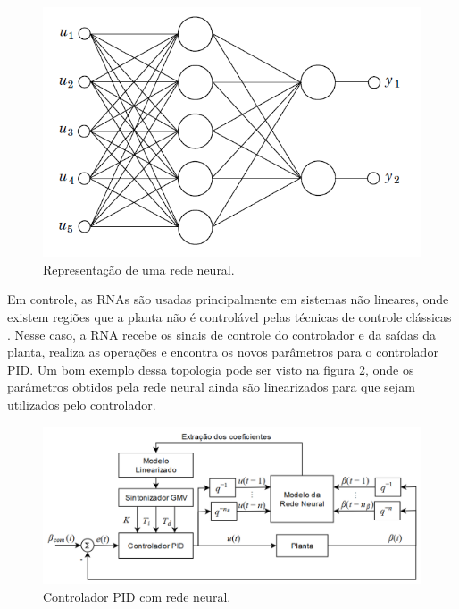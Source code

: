 \begin{figure}[H]
  \caption{Representação de uma rede neural.}
  \begin{center}
      \includegraphics[scale=0.5]{referencial/img/feedforward_neural_astrom_p297}
  \end{center}
  \label{fig:feedforward_neural_astrom_p297}
\end{figure}

Em controle, as RNAs são usadas principalmente em sistemas não lineares, onde existem regiões que a planta não é controlável pelas técnicas de controle clássicas . Nesse caso, a RNA recebe os sinais de controle do controlador e da saídas da planta, realiza as operações e encontra os novos parâmetros para o controlador PID. Um bom exemplo dessa topologia pode ser visto na figura \ref{fig:pid_neural_chen_p212}, onde os parâmetros obtidos pela rede neural ainda são linearizados para que sejam utilizados pelo controlador.

\begin{figure}[H]
  \caption{Controlador PID com rede neural.}
  \begin{center}
      \includegraphics[scale=0.55]{referencial/img/pid_neural_chen_p212}
  \end{center}
  \label{fig:pid_neural_chen_p212}
\end{figure}

